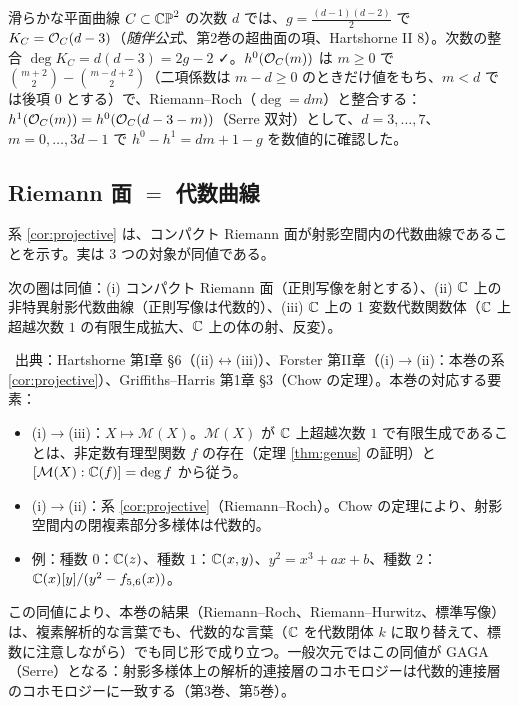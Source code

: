 \begin{ex}[平面曲線]\label{ex:planecurve}
滑らかな平面曲線 $C\subset\mathbb{CP}^2$ の次数 $d$ では、$g=\frac{(d-1)(d-2)}2$ で $K_C=\mathcal O_C(d-3)$（\emph{随伴公式}、第2巻の超曲面の項、Hartshorne II 8）\tC。次数の整合 $\deg K_C=d(d-3)=2g-2$ ✓。$h^0(\mathcal O_C(m))$ は $m\ge0$ で $\binom{m+2}2-\binom{m-d+2}2$（二項係数は $m-d\ge0$ のときだけ値をもち、$m<d$ では後項 $0$ とする）で、Riemann--Roch（$\deg=dm$）と整合する：$h^1(\mathcal O_C(m))=h^0(\mathcal O_C(d-3-m))$（Serre 双対）として、$d=3,\dots,7$、$m=0,\dots,3d-1$ で $h^0-h^1=dm+1-g$ を数値的に確認した。
\end{ex}

\subsection{Riemann 面 $=$ 代数曲線}
系 \ref{cor:projective} は、コンパクト Riemann 面が射影空間内の代数曲線であることを示す。実は 3 つの対象が同値である。
\begin{thm}\label{thm:equiv}
次の圏は同値：(i) コンパクト Riemann 面（正則写像を射とする）、(ii) $\mathbb C$ 上の非特異射影代数曲線（正則写像は代数的）、(iii) $\mathbb C$ 上の 1 変数代数関数体（$\mathbb C$ 上超越次数 $1$ の有限生成拡大、$\mathbb C$ 上の体の射、反変）。
\end{thm}
\tC\ 出典：Hartshorne 第I章 §6（(ii)$\leftrightarrow$(iii)）、Forster 第II章（(i)$\to$(ii)：本巻の系 \ref{cor:projective}）、Griffiths--Harris 第1章 §3（Chow の定理）\tQ。本巻の対応する要素：
\begin{itemize}
\item (i)$\to$(iii)：$X\mapsto\mathcal M(X)$。$\mathcal M(X)$ が $\mathbb C$ 上超越次数 $1$ で有限生成であることは、非定数有理型関数 $f$ の存在（定理 \ref{thm:genus} の証明）と $[\mathcal M(X):\mathbb C(f)]=\deg f$ から従う。
\item (i)$\to$(ii)：系 \ref{cor:projective}（Riemann--Roch）。Chow の定理により、射影空間内の閉複素部分多様体は代数的。
\item 例：種数 $0$：$\mathbb C(z)$、種数 $1$：$\mathbb C(x,y)$、$y^2=x^3+ax+b$、種数 $2$：$\mathbb C(x)[y]/(y^2-f_{5,6}(x))$。
\end{itemize}
この同値により、本巻の結果（Riemann--Roch、Riemann--Hurwitz、標準写像）は、複素解析的な言葉でも、代数的な言葉（$\mathbb C$ を代数閉体 $k$ に取り替えて、標数に注意しながら）でも同じ形で成り立つ。一般次元ではこの同値が GAGA（Serre）となる：射影多様体上の解析的連接層のコホモロジーは代数的連接層のコホモロジーに一致する（第3巻、第5巻）。

